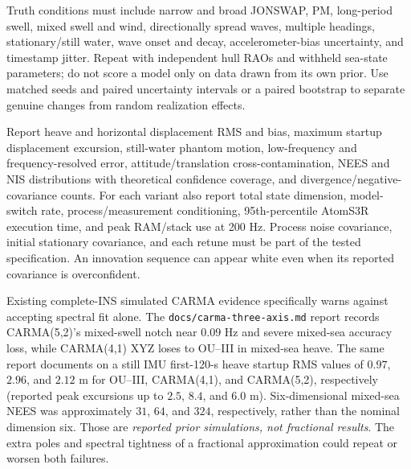 Truth conditions must include narrow and broad JONSWAP, PM,
long-period swell, mixed swell and wind, directionally spread
waves, multiple headings, stationary/still water, wave onset
and decay, accelerometer-bias uncertainty, and timestamp jitter.
Repeat with independent hull RAOs and withheld sea-state
parameters; do not score a model only on data drawn from its
own prior. Use matched seeds and paired uncertainty intervals
or a paired bootstrap to separate genuine changes from random
realization effects.

Report heave and horizontal displacement RMS and bias, maximum
startup displacement excursion, still-water phantom motion,
low-frequency and frequency-resolved error, attitude/translation
cross-contamination, NEES and NIS distributions with theoretical
confidence coverage, and divergence/negative-covariance counts.
For each variant also report total state dimension, model-switch
rate, process/measurement conditioning, 95th-percentile
AtomS3R execution time, and peak RAM/stack use at 200 Hz.
Process noise covariance, initial stationary covariance,
and each retune must be part of the tested specification.
An innovation sequence can appear white even when its
reported covariance is overconfident.

Existing complete-INS simulated CARMA evidence specifically warns
against accepting spectral fit alone. The
\texttt{docs/carma-three-axis.md} report records CARMA(5,2)'s
mixed-swell notch near \(0.09\) Hz and severe mixed-sea
accuracy loss, while CARMA(4,1) XYZ loses to OU--III in
mixed-sea heave. The same report documents on a still IMU
first-120-s heave startup RMS values of \(0.97\), \(2.96\),
and \(2.12\) m for OU--III, CARMA(4,1), and CARMA(5,2),
respectively (reported peak excursions up to \(2.5\), \(8.4\),
and \(6.0\) m). Six-dimensional mixed-sea NEES
was approximately \(31\), \(64\), and \(324\), respectively,
rather than the nominal dimension six. Those are
\emph{reported prior simulations, not fractional results}.
The extra poles and spectral tightness of a fractional approximation
could repeat or worsen both failures.

